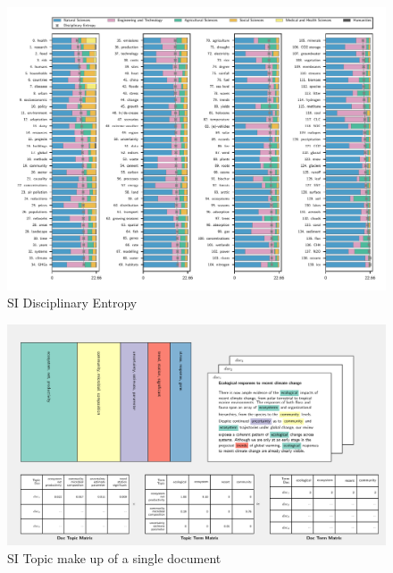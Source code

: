 \documentclass{article}
\begin{document}
	\begin{figure}
		\begin{center}
			\includegraphics[width=1\linewidth]{../plots_pub/topic_oecd_entropy.pdf}
			\caption{SI Disciplinary Entropy}
			\label{dis-entropy}
		\end{center}
	\end{figure}	
	
	
	
	\begin{figure}
		\begin{center}
			\includegraphics[width=1\linewidth]{../plots_pub/single_doc_3_536594_1861.pdf}
			\caption{SI Topic make up of a single document}
			\label{doc-topic}
		\end{center}
	\end{figure}
	
\end{document}
